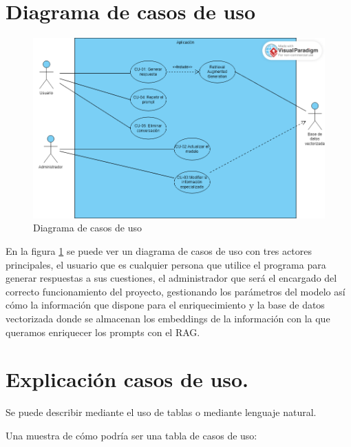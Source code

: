 \section{Diagrama de casos de uso}

\begin{figure}[h!]
    \centering
    \includegraphics[width=1\textwidth]{img/usecase.png}
    \caption{Diagrama de casos de uso}
    \label{fig:usecase}
\end{figure}

En la figura \ref{fig:usecase} se puede ver un diagrama de casos de uso con tres actores principales, el usuario que es cualquier persona que utilice el programa para generar respuestas a sus cuestiones, el administrador que será el encargado del correcto funcionamiento del proyecto, gestionando los parámetros del modelo así cómo la información que dispone para el enriquecimiento y la base de datos vectorizada donde se almacenan los embeddings de la información con la que queramos enriquecer los prompts con el RAG.

\section{Explicación casos de uso.}

Se puede describir mediante el uso de tablas o mediante lenguaje natural.    

Una muestra de cómo podría ser una tabla de casos de uso:

